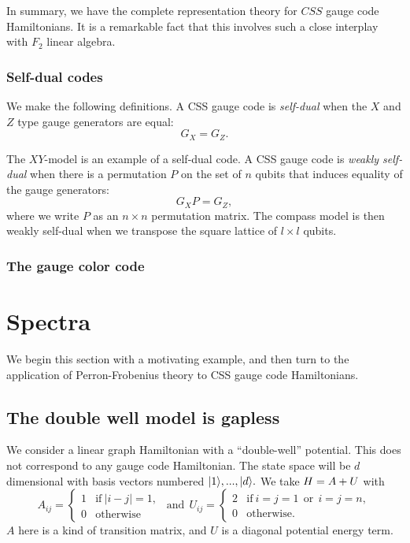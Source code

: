 \documentclass[12pt]{article}
\begin{document}
In summary, we have the
complete representation
theory for $CSS$ gauge code Hamiltonians.
It is a remarkable fact that this involves such
a close interplay with $F_2$ linear algebra.

\subsubsection{Self-dual codes}

We make the following definitions.
A CSS gauge code is \emph{self-dual} when the $X$ and $Z$ type
gauge generators are equal: $$G_X = G_Z.$$

The $XY$-model is an example of a self-dual code.
A CSS gauge code is \emph{weakly self-dual}
when there is a permutation $P$ on the set of $n$ qubits
that induces equality of the gauge generators:
$$
    G_X P = G_Z,
$$
where we write $P$ as an $n\times n$ permutation matrix.
The compass model is then weakly self-dual when we transpose
the square lattice of $l\times l$ qubits.


\subsubsection{The gauge color code}

%


\section{Spectra}
\label{spectra}

We begin this section with a motivating example,
and then turn to the application of
Perron-Frobenius theory to
CSS gauge code Hamiltonians.

\subsection{The double well model is gapless}

We consider a linear graph Hamiltonian
with a ``double-well'' potential.
This does not correspond to any gauge code Hamiltonian.
The state space will be $d$ dimensional with
basis vectors numbered $|{1}\rangle,...,|{d}\rangle.$
We take
$ H = A + U $
with
$$
A_{ij} = \left\{ \begin{array}{ll}
     1 &\mbox{if}\  |i-j|=1,  \\
     0 &\mbox{otherwise}\end{array}\right.
\ \ \mbox{and}\ \ 
U_{ij} =  \left\{ \begin{array}{ll}
     2 &\mbox{if}\  i=j=1 \ \ \mbox{or}\ \  i=j=n, \\
     0 &\mbox{otherwise.}\end{array}\right.
$$
$A$ here is a kind of transition matrix,
and $U$ is a diagonal potential energy term.
\end{document}
